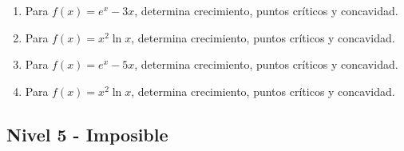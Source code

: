 \documentclass[11pt,a4paper]{article}
\begin{document}
\begin{enumerate}[label=\textbf{E\arabic*.},start=161]
\item Para $f(x)=e^x-3x$, determina crecimiento, puntos críticos y concavidad.

\item Para $f(x)=x^2\ln x$, determina crecimiento, puntos críticos y concavidad.

\item Para $f(x)=e^x-5x$, determina crecimiento, puntos críticos y concavidad.

\item Para $f(x)=x^2\ln x$, determina crecimiento, puntos críticos y concavidad.

\end{enumerate}

\newpage

\subsection{Nivel 5 - Imposible}
\end{document}
